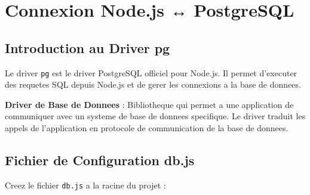\documentclass[a4paper,12pt]{book}
\begin{document}
\chapter{Connexion Node.js ↔ PostgreSQL}

\section{Introduction au Driver pg}

Le driver \texttt{pg} est le driver PostgreSQL officiel pour Node.js. Il permet d'executer des requetes SQL depuis Node.js et de gerer les connexions a la base de donnees.

\begin{definitionbox}
    \textbf{Driver de Base de Donnees} : Bibliotheque qui permet a une application de communiquer avec un systeme de base de donnees specifique. Le driver traduit les appels de l'application en protocole de communication de la base de donnees.
\end{definitionbox}

\section{Fichier de Configuration db.js}

Creez le fichier \texttt{db.js} a la racine du projet :
\end{document}

